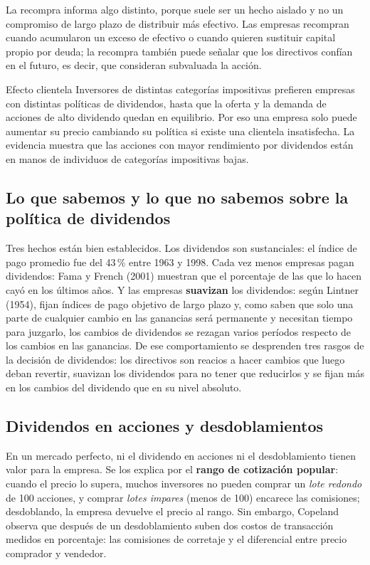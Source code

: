 La recompra informa algo distinto, porque suele ser un hecho aislado y no un compromiso de largo plazo de distribuir más efectivo. Las empresas recompran cuando acumularon un exceso de efectivo o cuando quieren sustituir capital propio por deuda; la recompra también puede señalar que los directivos confían en el futuro, es decir, que consideran subvaluada la acción.

\begin{definicion}{Efecto clientela}
Inversores de distintas categorías impositivas prefieren empresas con distintas políticas de dividendos, hasta que la oferta y la demanda de acciones de alto dividendo quedan en equilibrio. Por eso una empresa solo puede aumentar su precio cambiando su política si existe una clientela insatisfecha. La evidencia muestra que las acciones con mayor rendimiento por dividendos están en manos de individuos de categorías impositivas bajas.
\end{definicion}

\subsection{Lo que sabemos y lo que no sabemos sobre la política de dividendos}

Tres hechos están bien establecidos. Los dividendos son sustanciales: el índice de pago promedio fue del 43\,\% entre 1963 y 1998. Cada vez menos empresas pagan dividendos: Fama y French (2001) muestran que el porcentaje de las que lo hacen cayó en los últimos años. Y las empresas \textbf{suavizan} los dividendos: según Lintner (1954), fijan índices de pago objetivo de largo plazo y, como saben que solo una parte de cualquier cambio en las ganancias será permanente y necesitan tiempo para juzgarlo, los cambios de dividendos se rezagan varios períodos respecto de los cambios en las ganancias. De ese comportamiento se desprenden tres rasgos de la decisión de dividendos: los directivos son reacios a hacer cambios que luego deban revertir, suavizan los dividendos para no tener que reducirlos y se fijan más en los cambios del dividendo que en su nivel absoluto.

\subsection{Dividendos en acciones y desdoblamientos}

En un mercado perfecto, ni el dividendo en acciones ni el desdoblamiento tienen valor para la empresa. Se los explica por el \textbf{rango de cotización popular}: cuando el precio lo supera, muchos inversores no pueden comprar un \emph{lote redondo} de 100 acciones, y comprar \emph{lotes impares} (menos de 100) encarece las comisiones; desdoblando, la empresa devuelve el precio al rango. Sin embargo, Copeland observa que después de un desdoblamiento suben dos costos de transacción medidos en porcentaje: las comisiones de corretaje y el diferencial entre precio comprador y vendedor.

